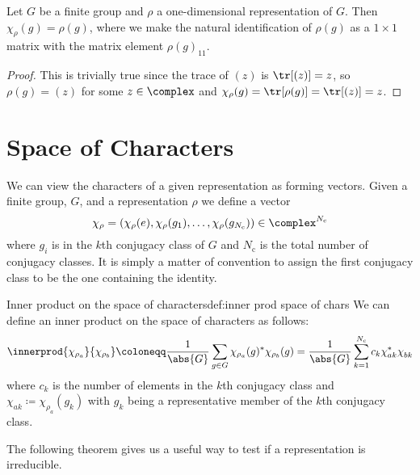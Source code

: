\begin{lma}{}{}
    Let \(G\) be a finite group and \(\rho\) a one-dimensional
    representation of \(G\).
    Then \(\chi_\rho(g) = \rho(g)\), where we make the natural
    identification of \(\rho(g)\) as a \(1\times 1\) matrix with the matrix element
    \(\rho(g)_{11}\).
    \begin{proof}
        This is trivially true since the trace of \((z)\) is \(\tr[(z)] =
        z\), so \(\rho(g) = (z)\) for some \(z \in \complex\) and \(\chi_\rho(g) =
        \tr[\rho(g)] = \tr[(z)] = z\).
    \end{proof}
\end{lma}

\section{Space of Characters}
We can view the characters of a given representation as forming vectors.
Given a finite group, \(G\), and a representation \(\rho\) we define a
vector
\begin{equation}
    \chi_\rho = (\chi_{\rho}(e), \chi_{\rho}(g_1), \dotsc,
    \chi_{\rho}(g_{N_\mathrm{c}})) \in \complex^{N_{\mathrm{c}}}
\end{equation}
where \(g_i\) is in the \(k\)th conjugacy class of \(G\) and
\(N_{\mathrm{c}}\) is the total number of conjugacy classes.
It is simply a matter of convention to assign the first conjugacy class to
be the one containing the identity.

\begin{dfn}{Inner product on the space of characters}{def:inner prod space
        of chars}
    We can define an inner product on the space of characters as follows:
    \begin{equation}
        \innerprod{\chi_{\rho_a}}{\chi_{\rho_b}} \coloneqq \frac{1}{\abs{G}}
        \sum_{g\in G} \chi_{\rho_a}(g)^{*} \chi_{\rho_b}(g) = \frac{1}{\abs{G}} \sum_{k
            = 1}^{N_{\mathrm{c}}} c_k \chi^*_{ak}\chi^{\phantom{*}}_{bk}
    \end{equation}
    where \(c_k\) is the number of elements in the \(k\)th conjugacy class
    and \(\chi_{ak} \coloneqq \chi_{\rho_a}(g_k)\) with \(g_k\) being a
    representative member of the \(k\)th conjugacy class.
\end{dfn}

The following theorem gives us a useful way to test if a representation is
irreducible.

